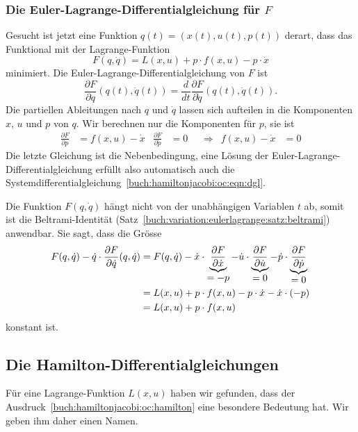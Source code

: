 %
%
\subsubsection{Die Euler-Lagrange-Differentialgleichung für $F$}
Gesucht ist jetzt eine Funktion $q(t)=(x(t),u(t),p(t))$ derart,
dass das Funktional mit der Lagrange-Funktion
\[
F(q,\dot{q})
=
L(x,u) +p\cdot f(x,u) - p\cdot \dot{x}
\]
minimiert.
Die Euler-Lagrange-Differentialgleichung von $F$ ist
\[
\frac{\partial F}{\partial q}(q(t),\dot{q}(t))
=
\frac{d}{dt}
\frac{\partial F}{\partial \dot{q}}(q(t),\dot{q}(t)).
\]
Die partiellen Ableitungen nach $q$ und $\dot{q}$ lassen sich aufteilen
in die Komponenten $x$, $u$ und $p$ von $q$.
Wir berechnen nur die Komponenten für $p$, sie ist
\begin{align*}
\frac{\partial F}{\partial p}
&=
f(x,u)
-
\dot{x}
&
\frac{\partial F}{\partial \dot{p}}
&=
0
&&\Rightarrow&
f(x,u)-\dot{x}&=0
\end{align*}
Die letzte Gleichung ist die Nebenbedingung, eine Lösung der
Euler-Lagrange-Differential\-gleichung erfüllt also automatisch auch die
Systemdifferentialgleichung~\eqref{buch:hamiltonjacobi:oc:eqn:dgl}.

Die Funktion $F(q,\dot{q})$ hängt nicht von der unabhängigen
Variablen $t$ ab, somit ist die Beltrami-Identität
(Satz~\ref{buch:variation:eulerlagrange:satz:beltrami})
anwendbar.
Sie sagt, dass die Grösse
\begin{align}
F(q,\dot{q})
-
\dot{q}\cdot\frac{\partial F}{\partial\dot{q}}(q,\dot{q})
&=
F(q,\dot{q})
-
\dot{x}\cdot
\underbrace{
\frac{\partial F}{\partial\dot{x}}
}_{\displaystyle=-p}
-
\dot{u}\cdot
\underbrace{
\frac{\partial F}{\partial\dot{u}}
}_{\displaystyle=0}
-
\dot{p}\cdot
\underbrace{
\frac{\partial F}{\partial\dot{p}}
}_{\displaystyle=0}
\notag
\\
&=
L(x,u)+p\cdot f(x,u)-p\cdot\dot{x}
-
\dot{x}\cdot
(-p)
\notag
\\
&=
L(x,u) + p\cdot f(x,u)
\label{buch:hamiltonjacobi:oc:hamilton}
\end{align}
konstant ist.

%
%
\subsection{Die Hamilton-Differentialgleichungen
\label{buch:hamiltonjacobi:oc:subsection:hamilton}}
Für eine Lagrange-Funktion $L(x,u)$ haben wir gefunden, dass der
Ausdruck~\eqref{buch:hamiltonjacobi:oc:hamilton} eine besondere
Bedeutung hat.
Wir geben ihm daher einen Namen.

